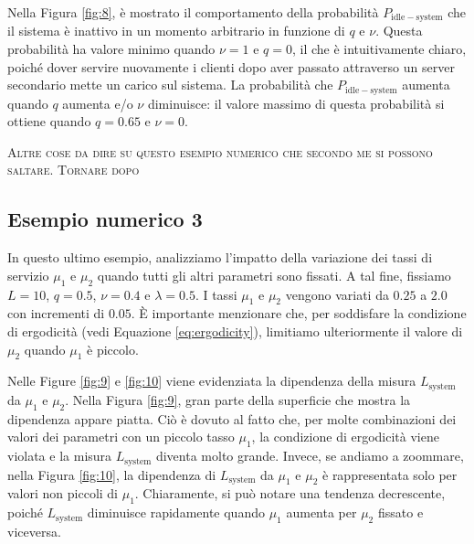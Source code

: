 \documentclass[11pt]{article}
\begin{document}
Nella Figura \ref{fig:8}, è mostrato il comportamento della probabilità $P_\mathrm{idle-system}$ che il sistema è inattivo in un momento arbitrario in funzione di $q$ e $\nu$. Questa probabilità ha valore minimo quando $\nu = 1$ e $q = 0$, il che è intuitivamente chiaro, poiché dover servire nuovamente i clienti dopo aver passato attraverso un server secondario mette un carico sul sistema. La probabilità che $P_\mathrm{idle-system}$ aumenta quando $q$ aumenta e/o $\nu$ diminuisce: il valore massimo di questa probabilità si ottiene quando $q = 0.65$ e $\nu = 0$.

\vspace{0.4cm}

\noindent \textsc{Altre cose da dire su questo esempio numerico che secondo me si possono saltare. Tornare dopo}

\clearpage
\subsection{Esempio numerico 3}

In questo ultimo esempio, analizziamo l'impatto della variazione dei tassi di servizio $\mu_1$ e $\mu_2$ quando tutti gli altri parametri sono fissati. A tal fine, fissiamo $L = 10$, $q = 0.5$, $\nu = 0.4$ e $\lambda = 0.5$. I tassi $\mu_1$ e $\mu_2$ vengono variati da $0.25$ a $2.0$ con incrementi di $0.05$. È importante menzionare che, per soddisfare la condizione di ergodicità (vedi Equazione \ref{eq:ergodicity}), limitiamo ulteriormente il valore di $\mu_2$ quando $\mu_1$ è piccolo.

Nelle Figure \ref{fig:9} e \ref{fig:10} viene evidenziata la dipendenza della misura $L_{\text{system}}$ da $\mu_1$ e $\mu_2$. Nella Figura \ref{fig:9}, gran parte della superficie che mostra la dipendenza appare piatta. Ciò è dovuto al fatto che, per molte combinazioni dei valori dei parametri con un piccolo tasso $\mu_1$, la condizione di ergodicità viene violata e la misura $L_{\text{system}}$ diventa molto grande. Invece, se andiamo a zoommare, nella Figura \ref{fig:10}, la dipendenza di $L_{\text{system}}$ da $\mu_1$ e $\mu_2$ è rappresentata solo per valori non piccoli di $\mu_1$. Chiaramente, si può notare una tendenza decrescente, poiché $L_{\text{system}}$ diminuisce rapidamente quando $\mu_1$ aumenta per $\mu_2$ fissato e viceversa.
\end{document}
